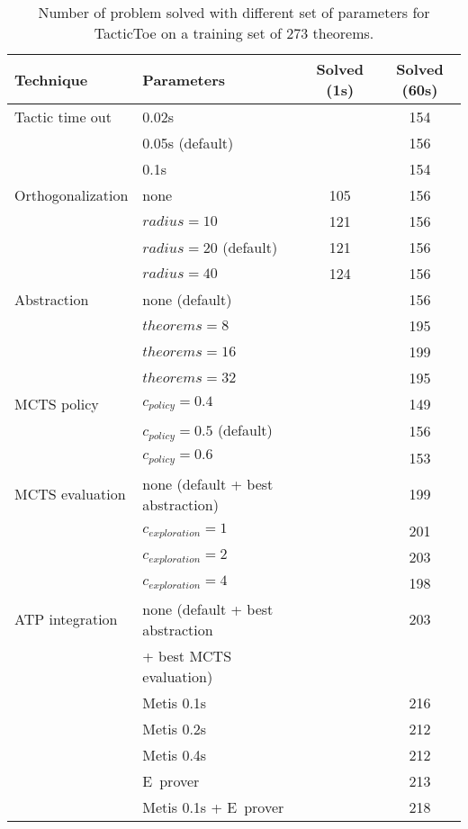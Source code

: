 \documentclass[runningheads,a4paper,draft]{svjour3}
\def\eprover{\textsf{E~prover}\xspace}
\def\metis{\textsf{Metis}\xspace}
\def\tactictoe{\textsf{TacticToe}\xspace}
\newcommand{\ra}[1]{\renewcommand{\arraystretch}{#1}}
\begin{document}
\begin{table}[ht]
\centering\ra{1.3}
\small
\begin{tabular}{llcc}
\toprule
 Technique & Parameters & Solved (1s) & Solved (60s)\\
\midrule
Tactic time out & 0.02s && 154\\
                & 0.05s (default) && 156\\
                & 0.1s && 154\\
\midrule
Orthogonalization & none & 105 & 156 \\
                  & $radius = 10$ & 121 & 156 \\
                  & $radius = 20$ (default) & 121 & 156 \\
                  & $radius = 40$ & 124 & 156 \\
\midrule
Abstraction       & none (default)  && 156\\
                  & $theorems = 8$  && 195\\
                  & $theorems = 16$ && 199\\
                  & $theorems = 32$ && 195\\
\midrule
MCTS policy & $c_{policy} = 0.4$ && 149\\
            & $c_{policy} = 0.5$ (default) && 156\\
            & $c_{policy} = 0.6$ && 153\\
\midrule
MCTS evaluation & none (default + best abstraction) && 199\\
				& $c_{exploration} = 1$ && 201\\
				& $c_{exploration} = 2$ && 203\\
				& $c_{exploration} = 4$ && 198\\
\midrule
ATP integration & none (default + best abstraction && 203\\
                &  + best MCTS evaluation) &&\\
                & \metis 0.1s && 216\\
                & \metis 0.2s && 212\\
                & \metis 0.4s && 212\\
                & \eprover && 213\\
                & \metis 0.1s + \eprover && 218\\
\bottomrule
\end{tabular}
\caption{\label{tab:tuning} Number of problem solved with different set of
parameters for \tactictoe on a training set of 273 theorems.}
\end{table}
\end{document}
